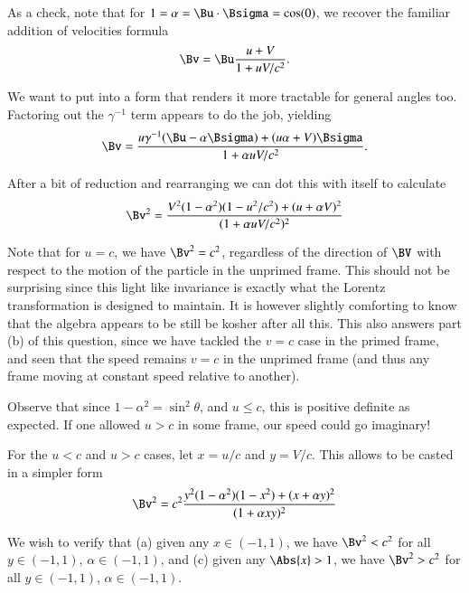 {As a check, note that for \(1 = \alpha = \Bu \cdot \Bsigma = \cos(0)\), we recover the familiar addition of velocities formula
%
\begin{equation}\label{eqn:relativisticElectrodynamicsA1:260b}
\Bv = \Bu \frac{u + V}{ 1 + u V/c^2 }.
\end{equation}

We want to put  into a form that renders it more tractable for general angles too.  Factoring out the \(\gamma^{-1}\) term appears to do the job, yielding
%
\begin{equation}\label{eqn:relativisticElectrodynamicsA1:260c}
\Bv = \frac{u \gamma^{-1} (\Bu -\alpha \Bsigma) + (u \alpha + V) \Bsigma}{ 1 + \alpha u V/c^2 }.
\end{equation}

After a bit of reduction and rearranging we can dot this with itself to calculate
%
\begin{equation}\label{eqn:relativisticElectrodynamicsA1:270}
\Bv^2 = \frac{V^2(1 - \alpha^2)(1 - u^2/c^2) + (u + \alpha V)^2}{ (1 + \alpha u V/c^2)^2 }
\end{equation}

Note that for \(u = c\), we have \(\Bv^2 = c^2\), regardless of the direction of \(\BV\) with respect to the motion of the particle in the unprimed frame.  This should not be surprising since this light like invariance is exactly what the Lorentz transformation is designed to maintain.  It is however slightly comforting to know that the algebra appears to be still be kosher after all this.  This also answers part (b) of this question, since we have tackled the \(v = c\) case in the primed frame, and seen that the speed remains \(v = c\) in the unprimed frame (and thus any frame moving at constant speed relative to another).

Observe that since \(1 - \alpha^2 = \sin^2\theta\), and \(u \le c\), this is positive definite as expected.  If one allowed \(u > c\) in some frame, our speed could go imaginary!

For the \(u < c\) and \(u > c\) cases, let \(x = u/c\) and \(y = V/c\).  This allows  to be casted in a simpler form
%
\begin{equation}\label{eqn:relativisticElectrodynamicsA1:270e}
\Bv^2 = c^2 \frac{y^2 (1 - \alpha^2)(1 - x^2) + (x + \alpha y)^2}{ (1 + \alpha x y)^2 }
\end{equation}

We wish to verify that (a) given any \(x \in (-1,1)\), we have \(\Bv^2 < c^2\) for all \(y \in (-1,1)\), \(\alpha \in (-1,1)\), and (c) given any \(\Abs{x} > 1\), we have \(\Bv^2 > c^2\) for all \(y \in (-1,1)\), \(\alpha \in (-1,1)\).

}
